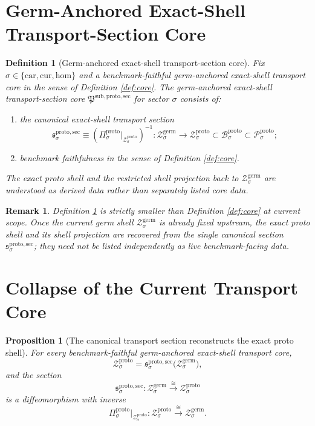 \documentclass[11pt]{article}
\newcommand{\Car}{\mathrm{car}}
\newcommand{\Cur}{\mathrm{cur}}
\newcommand{\Hom}{\mathrm{hom}}
\newcommand{\GermShell}[1]{\mathcal Z_{#1}^{\mathrm{germ}}}
\newcommand{\ProtoSectionCore}{\mathfrak P^{\mathrm{sub,proto,sec}}}
\newcommand{\ProtoState}[1]{\mathcal P_{#1}^{\mathrm{proto}}}
\newcommand{\ProtoBody}[1]{\mathcal B_{#1}^{\mathrm{proto}}}
\newcommand{\ProtoProj}[1]{\Pi_{#1}^{\mathrm{proto}}}
\newcommand{\ProtoShell}[1]{\mathcal Z_{#1}^{\mathrm{proto}}}
\newcommand{\ProtoTransportSec}[1]{\mathfrak s_{#1}^{\mathrm{proto,sec}}}
\newtheorem{definition}{Definition}
\newtheorem{proposition}{Proposition}
\newtheorem{remark}{Remark}
\begin{document}
\section{Germ-Anchored Exact-Shell Transport-Section Core}

\begin{definition}[Germ-anchored exact-shell transport-section core]
\label{def:sectioncore}
Fix \(\sigma\in\{\Car,\Cur,\Hom\}\) and a benchmark-faithful germ-anchored exact-shell transport core in the sense of Definition \ref{def:core}. The \emph{germ-anchored exact-shell transport-section core} \(\ProtoSectionCore\) for sector \(\sigma\) consists of:
\begin{enumerate}
    \item the canonical exact-shell transport section
    \[
    \ProtoTransportSec{\sigma}
    \equiv
    \left(
    \ProtoProj{\sigma}\big|_{\ProtoShell{\sigma}}
    \right)^{-1}
    :
    \GermShell{\sigma}\to\ProtoShell{\sigma}\subset\ProtoBody{\sigma}\subset\ProtoState{\sigma};
    \]
    \item benchmark faithfulness in the sense of Definition \ref{def:core}.
\end{enumerate}
The exact proto shell and the restricted shell projection back to \(\GermShell{\sigma}\) are understood as derived data rather than separately listed core data.
\end{definition}

\begin{remark}
Definition \ref{def:sectioncore} is strictly smaller than Definition \ref{def:core} at current scope. Once the current germ shell \(\GermShell{\sigma}\) is already fixed upstream, the exact proto shell and its shell projection are recovered from the single canonical section \(\ProtoTransportSec{\sigma}\); they need not be listed independently as live benchmark-facing data.
\end{remark}

\section{Collapse of the Current Transport Core}

\begin{proposition}[The canonical transport section reconstructs the exact proto shell]
\label{prop:reconstructshell}
For every benchmark-faithful germ-anchored exact-shell transport core,
\[
\ProtoShell{\sigma}
=
\ProtoTransportSec{\sigma}\bigl(\GermShell{\sigma}\bigr),
\]
and the section
\[
\ProtoTransportSec{\sigma}
:
\GermShell{\sigma}\xrightarrow{\cong}\ProtoShell{\sigma}
\]
is a diffeomorphism with inverse
\[
\ProtoProj{\sigma}\big|_{\ProtoShell{\sigma}}
:
\ProtoShell{\sigma}\xrightarrow{\cong}\GermShell{\sigma}.
\]
\end{proposition}
\end{document}
